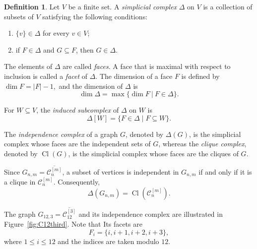 \documentclass[12pt,reqno]{amsart}
\theoremstyle{definition}
\newtheorem{definition}{Definition}
\numberwithin{equation}{section}
\def\C{\mathcal{C}}
\def\K{\mathbb{K}}
\begin{document}
%
\begin{definition}
	Let $V$ be a finite set. A \emph{simplicial complex} $\Delta$ on $V$
	is a collection of subsets of $V$ satisfying the following conditions:
	\begin{enumerate}
		\item $\{v\}\in\Delta$ for every $v\in V$;
		\item if $F\in\Delta$ and $G\subseteq F$, then $G\in\Delta$.
	\end{enumerate}
	The elements of $\Delta$ are called \emph{faces}. A face that is maximal
	with respect to inclusion is called a \emph{facet} of $\Delta$.
	The dimension of a face $F$ is defined by \( \dim F=|F|-1, \)
	and the dimension of $\Delta$ is
	\[
	\dim\Delta=\max\{\dim F~|~F\in\Delta\}.
	\]
\end{definition}
For $W\subseteq V$, the \emph{induced subcomplex} of $\Delta$ on $W$
is
\[
\Delta[W]=\{F\in\Delta\mid F\subseteq W\}.
\]

The \emph{independence complex} of a graph $G$, denoted by
$\Delta(G)$, is the simplicial complex whose faces are the independent
sets of $G$, whereas the \emph{clique complex}, denoted by
$\operatorname{Cl}(G)$, is the simplicial complex whose faces are the
cliques of $G$.

Since $G_{n,m}=\overline{\C_n^{[m]}}$, a subset of vertices is
independent in $G_{n,m}$ if and only if it is a clique in
$\C_n^{[m]}$. Consequently,
\[
\Delta(G_{n,m})
=
\operatorname{Cl}(\C_n^{[m]}).
\]

The graph $G_{12,3}=\overline{\C_{12}^{[3]}}$
and its independence complex are illustrated in Figure~\ref{fig:C12third}. Note that Its facets are
\[
F_i=\{i,i+1,i+2,i+3\},
\]
where \( 1\leq i\leq12 \) and the indices are taken modulo $12$.
\end{document}
